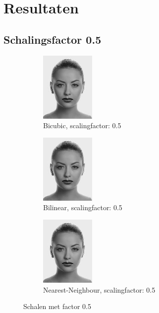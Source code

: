 \documentclass{article}
\begin{document}
\section{Resultaten}



\subsection{Schalingsfactor 0.5}

\begin{figure}[H]
\centering
    \begin{subfigure}{.5\textwidth}
      \centering
      \includegraphics[]{assets/Bicubic_Female_05.png}
      \caption{Bicubic, scalingfactor: 0.5}
      \label{fig:sub1}
    \end{subfigure}%
    \begin{subfigure}{.5\textwidth}
      \centering
      \includegraphics[]{assets/Bilinear_Female_05.png}
      \caption{Bilinear, scalingfactor: 0.5}
      \label{fig:sub2}
    \end{subfigure}
    \begin{subfigure}{.5\textwidth}
      \centering
      \includegraphics[]{assets/Nearest_Female_05.png}
      \caption{Nearest-Neighbour, scalingfactor: 0.5}
      \label{fig:sub3}
    \end{subfigure}
    \caption{Schalen met factor 0.5}
    \label{fig:test}
\end{figure}
\end{document}
